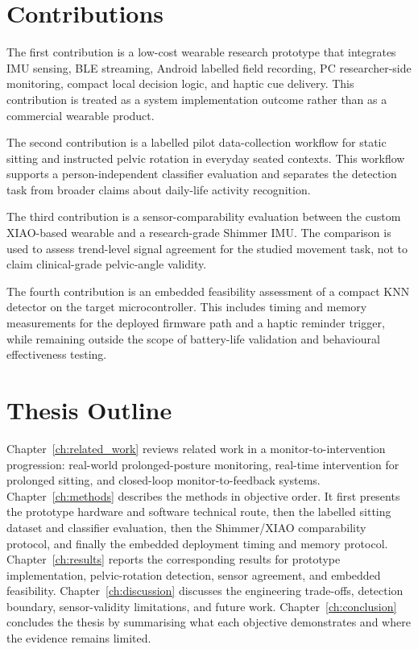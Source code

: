 \section{Contributions}

The first contribution is a low-cost wearable research prototype that integrates IMU sensing, BLE streaming, Android labelled field recording, PC researcher-side monitoring, compact local decision logic, and haptic cue delivery. This contribution is treated as a system implementation outcome rather than as a commercial wearable product.

The second contribution is a labelled pilot data-collection workflow for static sitting and instructed pelvic rotation in everyday seated contexts. This workflow supports a person-independent classifier evaluation and separates the detection task from broader claims about daily-life activity recognition.

The third contribution is a sensor-comparability evaluation between the custom XIAO-based wearable and a research-grade Shimmer IMU. The comparison is used to assess trend-level signal agreement for the studied movement task, not to claim clinical-grade pelvic-angle validity.

The fourth contribution is an embedded feasibility assessment of a compact KNN detector on the target microcontroller. This includes timing and memory measurements for the deployed firmware path and a haptic reminder trigger, while remaining outside the scope of battery-life validation and behavioural effectiveness testing.

\section{Thesis Outline}

Chapter~\ref{ch:related_work} reviews related work in a monitor-to-intervention progression: real-world prolonged-posture monitoring, real-time intervention for prolonged sitting, and closed-loop monitor-to-feedback systems. Chapter~\ref{ch:methods} describes the methods in objective order. It first presents the prototype hardware and software technical route, then the labelled sitting dataset and classifier evaluation, then the Shimmer/XIAO comparability protocol, and finally the embedded deployment timing and memory protocol. Chapter~\ref{ch:results} reports the corresponding results for prototype implementation, pelvic-rotation detection, sensor agreement, and embedded feasibility. Chapter~\ref{ch:discussion} discusses the engineering trade-offs, detection boundary, sensor-validity limitations, and future work. Chapter~\ref{ch:conclusion} concludes the thesis by summarising what each objective demonstrates and where the evidence remains limited.
